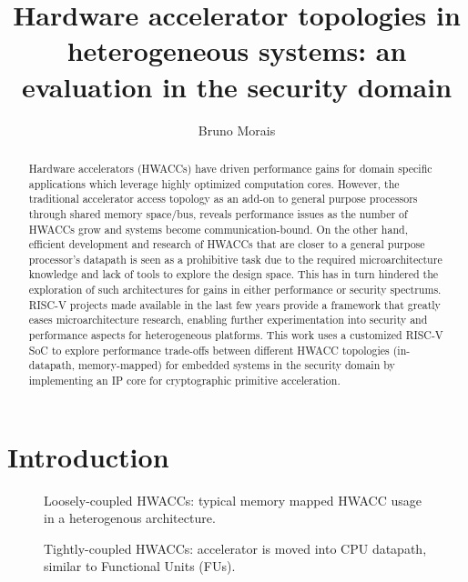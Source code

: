 \documentclass[10pt,conference]{IEEEtran}
\title{\textbf{Hardware accelerator topologies in heterogeneous systems: an evaluation in the
    security domain}}
\author{Bruno Morais}
\date{}
\begin{document}
\maketitle

\begin{abstract}
  Hardware accelerators (HWACCs) have driven performance gains for
  domain specific applications which leverage highly optimized computation
  cores. However, the traditional accelerator access topology as an add-on to
  general purpose processors through shared memory space/bus, reveals performance
  issues as the number of HWACCs grow and systems become
  communication-bound.
  On the other hand, efficient development and research of HWACCs
  that are closer to a general purpose processor's datapath is seen as a
  prohibitive task due to the required microarchitecture knowledge and lack of
  tools to explore the design space. This has in turn hindered the exploration of
  such architectures for gains in either performance or security spectrums.
  RISC-V projects made available in the last few years provide a framework that
  greatly eases microarchitecture research, enabling further experimentation
  into security and performance aspects for heterogeneous platforms.
  This work uses a customized RISC-V SoC to explore performance trade-offs
  between different HWACC topologies (in-datapath, memory-mapped) for embedded
  systems in the security domain by implementing an IP core for cryptographic
  primitive acceleration.

\end{abstract}

\section{Introduction}

\begin{figure}
  \centering
  
  \caption{Loosely-coupled HWACCs: typical memory mapped HWACC usage in a heterogenous architecture.}
\end{figure}

\begin{figure}
  \centering
  \caption{Tightly-coupled HWACCs: accelerator is moved into CPU datapath,
    similar to Functional Units (FUs).}
\end{figure}
\end{document}
